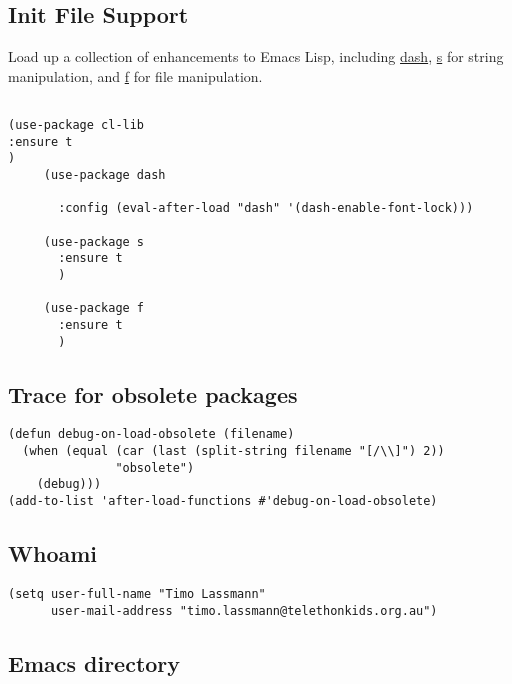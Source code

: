 \documentclass[12pt]{article}
\begin{document}
\subsection{Init File Support}
\label{sec:orgdf8c053}

Load up a collection of enhancements to Emacs Lisp, including \href{https://github.com/magnars/dash.el}{dash},
\href{https://github.com/magnars/s.el}{s} for string manipulation, and \href{https://github.com/rejeep/f.el}{f} for file manipulation.

\begin{verbatim}

(use-package cl-lib
:ensure t
)
     (use-package dash

       :config (eval-after-load "dash" '(dash-enable-font-lock)))

     (use-package s
       :ensure t
       )

     (use-package f
       :ensure t
       )
\end{verbatim}

\subsection{Trace for obsolete packages}
\label{sec:orgf386951}

\begin{verbatim}
(defun debug-on-load-obsolete (filename)
  (when (equal (car (last (split-string filename "[/\\]") 2))
               "obsolete")
    (debug)))
(add-to-list 'after-load-functions #'debug-on-load-obsolete)
\end{verbatim}

\subsection{Whoami}
\label{sec:org8b83f6f}

\begin{verbatim}
(setq user-full-name "Timo Lassmann"
      user-mail-address "timo.lassmann@telethonkids.org.au")
\end{verbatim}

\subsection{Emacs directory}
\label{sec:orgcb6e6f6}
\end{document}
